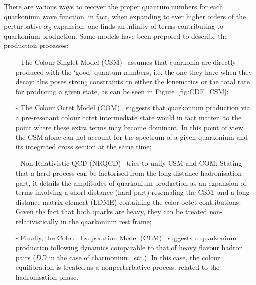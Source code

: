 There are various ways to recover the proper quantum numbers for each
quarkonium wave function: in fact, when expanding to ever higher
orders of the perturbative $\alpha_{S}$ expansion, one finds an
infinity of terms contributing to quarkonium production. Some
models have been proposed to describe the production processes: 
\begin{itemize}
\item[-] The Colour Singlet Model (CSM)~\cite{CSM} assumes that quarkonia are directly
  produced with the `good' quantum numbers, i.e. the one they have
  when they decay: this poses strong
  constraints on either the kinematics or the total rate for producing
  a given state, as can be seen in Figure~\ref{fig:CDF_CSM};
\item[-] The Colour Octet Model (COM)~\cite{Braaten:1994vv} suggests that quarkonium production via
  a pre-resonant colour octet intermediate state would in fact matter,
  to the point where these extra terms may
  become dominant. In this point of view the CSM alone can not
  account for the spectrum of a given quarkonium and its integrated
  cross section at the same time;
\item[-] Non-Relativistic QCD (NRQCD)~\cite{nrqcd} tries to unify CSM and COM:
  Stating that a hard process can be factorised from the long distance
  hadronisation
  part, it details the amplitudes of quarkonium production as an
  expansion of terms involving a short distance (hard part) resembling
  the CSM, and a long distance matrix element (LDME) containing
  the color octet contributions. Given the fact that both quarks are heavy,
  they can be treated non-relativistically in the quarkonium rest
  frame;%
\item[-] Finally, the Colour
  Evaporation Model (CEM)~\cite{Amundson:1996qr} suggests a quarkonium production following
  dynamics comparable to that of heavy flavour hadron pairs
  ($D\bar{D}$ in the case of charmonium, \textit{etc.}). %
  In this case, the colour equilibration is treated
  as a nonperturbative process, related to the hadronisation phase.
\end{itemize}




